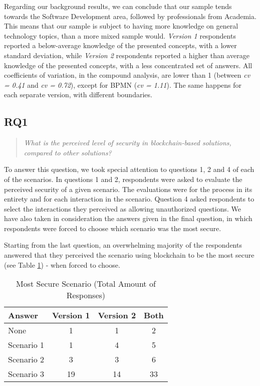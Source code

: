 Regarding our background results, we can conclude that our sample tends towards the Software Development area, followed by professionals from Academia. This means that our sample is subject to having more knowledge on general technology topics, than a more mixed sample would. \textit{Version 1} respondents reported a below-average knowledge of the presented concepts, with a lower standard deviation, while \textit{Version 2} respondents reported a higher than average knowledge of the presented concepts, with a less concentrated set of answers. All coefficients of variation, in the compound analysis, are lower than 1 (between \textit{cv = 0.41} and \textit{cv = 0.72}), except for BPMN (\textit{cv = 1.11}). The same happens for each separate version, with different boundaries.

\subsection{RQ1}

\begin{quote}
\textit{What is the perceived level of security in blockchain-based solutions, compared to other solutions?}
\end{quote}

To answer this question, we took special attention to questions 1, 2 and 4 of each of the scenarios. In questions 1 and 2, respondents were asked to evaluate the perceived security of a given scenario. The evaluations were for the process in its entirety and for each interaction in the scenario. Question 4 asked respondents to select the interactions they perceived as allowing unauthorized questions. We have also taken in consideration the answers given in the final question, in which respondents were forced to choose which scenario was the most secure.

Starting from the last question, an overwhelming majority of the respondents answered that they perceived the scenario using blockchain to be the most secure (see Table \ref{tab: mostSecure}) - when forced to choose.

\begin{table}[htb]
    \centering
    \caption{Most Secure Scenario (Total Amount of Responses)}
    \label{tab: mostSecure}
    \begin{tabular}{l|ccc}
    \hline \bf Answer & \bf Version 1 & \bf Version 2  & \bf Both \\ \hline
    None       & 1  & 1  & 2  \\
    Scenario 1 & 1  & 4  & 5  \\
    Scenario 2 & 3  & 3  & 6 \\
    Scenario 3 & 19 & 14 & 33  \\
    \hline
    \end{tabular}
\end{table}

